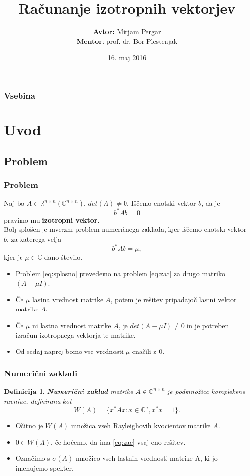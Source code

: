 \documentclass{beamer}
\title[Računanje izotropnih vektorjev] %
{Računanje izotropnih vektorjev}
\author[Mirjam Pergar] %
{\textbf{Avtor:}  Mirjam Pergar\\
\textbf{Mentor:} prof. dr. Bor Plestenjak
}
\institute[Fakuleta za matematiko in fiziko] %
\date[16. maj 2016] %
{16. maj 2016}
\newcommand{\R}{\mathbb R}
\newcommand{\C}{\mathbb C}
\newtheorem{definicija}[izrek]{Definicija}
\begin{document}
\begin{frame}
  \titlepage
\end{frame}

\begin{frame}
  \frametitle{Vsebina}
  \tableofcontents
\end{frame}


\section{Uvod}
\subsection{Problem}
\begin{frame}
  \frametitle{Problem}
\begin{alertblock}{}
Naj bo $A\in\R^{n\times n} (\C^{n\times n})$, $det(A)\ne 0$. Iščemo enotski vektor $b$, da je
\begin{equation}\label{eq:zac}
b^\ast Ab=0
\end{equation}
pravimo mu \textbf{izotropni vektor}. \medskip \\
Bolj splošen je inverzni problem numeričnega zaklada, kjer iščemo enotski vektor $b$, za katerega velja:
\begin{equation}\label{eq:splosno}
b^\ast Ab=\mu,
\end{equation}
kjer je $\mu \in \C$ dano število.
\end{alertblock}
\end{frame}
\begin{frame}
\begin{itemize}
\item Problem \eqref{eq:splosno} prevedemo na problem \eqref{eq:zac} za drugo matriko $ (A-\mu I)$.\medskip
\item Če $\mu$ lastna vrednost matrike $A$, potem je rešitev pripadajoč lastni vektor matrike $A$.\medskip
\item Če $\mu$ ni lastna vrednost matrike $A$, je $det(A-\mu I)\ne 0$ in je potreben izračun izotropnega vektorja te matrike.\medskip
\item Od sedaj naprej bomo vse vrednosti $\mu$ enačili z $0$.\medskip
\end{itemize}
\end{frame}
\begin{frame}
\frametitle{Numerični zakladi}
\begin{definicija}
\textbf{Numerični zaklad} matrike $A \in \C^{n\times n}$ je podmnožica kompleksne ravnine, definirana kot
$$W(A)=\{x^\ast Ax: x \in \C^n, x^\ast x=1\}.$$
\end{definicija}\pause
\begin{itemize}
\item Očitno je $W(A)$ množica vseh Rayleighovih kvocientov matrike $A$.
\item $0 \in W(A)$, če hočemo, da ima \eqref{eq:zac} vsaj eno rešitev.
\item Označimo s $\sigma(A)$ množico vseh lastnih vrednosti matrike A, ki jo imenujemo spekter.
\end{itemize}
\end{frame}
\end{document}
